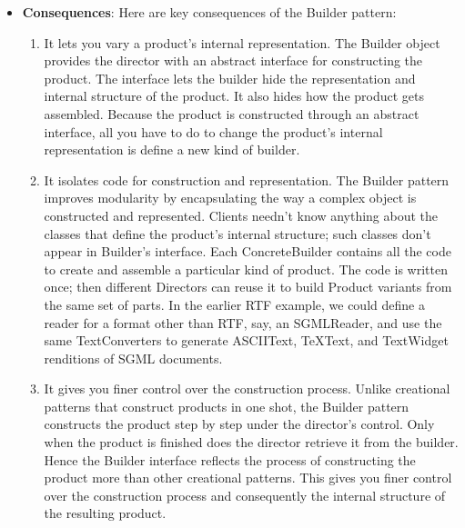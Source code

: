 \documentclass{report}
\begin{document}
\begin{itemize}
\begin{itemize}
                    \item Director notifies the builder whenever a part of the product should be built.
                    \item Builder handles requests from the director and adds parts to the product.
                    \item The client retrieves the product from the builder
                \end{itemize}
                \bigbreak \noindent 
            \item \textbf{Consequences}: Here are key consequences of the Builder pattern:
                \begin{enumerate}
                    \item It lets you vary a product's internal representation. The Builder object provides the director with an abstract interface for constructing the product. The interface lets the builder hide the representation and internal structure of the product. It also hides how the product gets assembled. Because the product is constructed through an abstract interface, all you have to do to change the product's internal representation is define a new kind of builder.
                    \item It isolates code for construction and representation. The Builder pattern improves modularity by encapsulating the way a complex object is constructed and represented. Clients needn't know anything about the classes that define the product's internal structure; such classes don't appear in Builder's interface.
                        \bigbreak \noindent 
                        Each ConcreteBuilder contains all the code to create and assemble a particular kind of product. The code is written once; then different Directors can reuse it to build Product variants from the same set of parts. In the earlier RTF example, we could define a reader for a format other than RTF, say, an SGMLReader, and use the same TextConverters to generate ASCIIText, TeXText, and TextWidget renditions of SGML documents.
                    \item It gives you finer control over the construction process. Unlike creational patterns that construct products in one shot, the Builder pattern constructs the product step by step under the director's control. Only when the product is finished does the director retrieve it from the builder. Hence the Builder interface reflects the process of constructing the product more than other creational patterns. This gives you finer control over the construction process and consequently the internal structure of the resulting product.

\end{enumerate}
\end{itemize}
\end{document}
